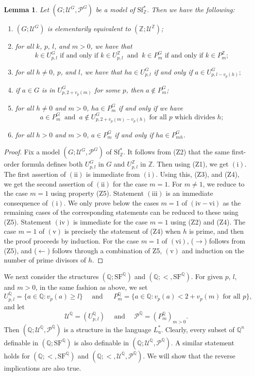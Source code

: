 \documentclass[letterpaper]{amsart}
\newcommand{\qq}{\mathbb{Q}}
\newcommand{\zz}{\mathbb{Z}}
\newcommand{\sU}{\mathscr{U}}
\newcommand{\sP}{\mathscr{P}}
\newcommand{\SQ}{\mathrm{SF}^\qq}
\newcommand{\WSFZ}{\mathrm{Sf}^*_{\zz}}
\newtheorem{lem}[thm]{Lemma}
\begin{document}
\begin{lem} \label{basicpropertiesZ}
Let $(G; \sU^G, \sP^G)$ be a model of $\WSFZ$. Then we have the following:
\begin{enumerate}
\item[$\mathrm{(i)}$] $(G; \sU^G)$ is elementarily equivalent to $(\zz; \sU^\zz)$;
\item[$\mathrm{(ii)}$] for all $k$, $p$, $l$, and $m>0$, we have  that
$$k \in U^G_{p,l} \text{ if and only if } k \in U^\zz_{p,l} \ \text{ and }\  k \in P^G_m \text{ if and only if } k \in P^\zz_m;$$
\item[$\mathrm{(iii)}$] for all $h\neq 0 $, $p$, and $l$, we have that $ha \in U^G_{p,l}$  if and only if $ a \in U^G_{p,l-v_p(h)}; $
\item[$\mathrm{(iv)}$] if $a\in G$ is in $U^G_{p, 2+v_p(m)}$ for some $p$, then $a \notin P^G_m$;
\item[$\mathrm{(v)}$]for all $h\neq 0$ and $m>0$, $ha \in P^G_{m}$ if and only if we have
$$ a \in P^G_{m} \ \text{ and }  \  a \notin U^G_{p,2+ v_p(m) -v_p(h)} \text{ for all } p \text{ which divides } h;$$
\item[$\mathrm{(vi)}$] for all $h>0$ and $m>0$, $a \in P^G_{m}$ if and only if  $ha \in P^G_{mh}$. 
\end{enumerate}
\end{lem}
\begin{proof}
Fix a model $(G; \sU^G, \sP^G)$ of $\WSFZ$.  It follows from (Z2) that the same first-order formula defines both  $U^G_{p,l}$ in $G$ and $U^\zz_{p,l}$ in $\zz$. Then using (Z1), we get $\mathrm{(i)}$. The first assertion of  $\mathrm{(ii)}$ is immediate from $\mathrm{(i)}$. Using this, (Z3), and (Z4), we get the second assertion of  $\mathrm{(ii)}$ for the case $m=1$. For $m \neq 1$,  we reduce to the case $m=1$ using property (Z5). Statement  $\mathrm{(iii)}$ is an immediate consequence of $\mathrm{(i)}$. We only prove below the cases $m = 1$ of $\mathrm{(iv-vi)} $ as the remaining cases of the corresponding statements can be reduced to these using (Z5). Statement $\mathrm{(iv)}$ is immediate for the case $m=1$ using (Z2) and (Z4). The case $m=1$ of $\mathrm{(v)}$ is precisely the statement of (Z4) when $h$ is prime, and then the proof proceeds by induction. For the case $m=1$ of $\mathrm{(vi)}$, ($\rightarrow$) follows from (Z5), and ($\leftarrow$) follows through a combination of Z5, $\mathrm{(v)}$ and induction on the number of prime divisors of $h$. 
\end{proof}

\noindent We next consider the structures $(\qq; \SQ)$ and  $(\qq; <,  \SQ)$. For given $p$, $l$, and $m>0$, in the same fashion as above,  we set 
$$U^\qq_{p, l} = \{ a \in \qq : v_p(a) \geq l\}\quad  \text{ and } \quad \ P^\qq_m = \{ a \in \qq : v_p(a) < 2 + v_p(m) \text{ for  all } p\},$$
 and let
$$\sU^\qq = ( U^\qq_{p, l})\quad  \text{ and } \quad  \sP^\qq = (P^\qq_m)_{m>0}.$$ 
Then $(\qq; \sU^\qq, \sP^\qq)$ is a structure in the language $L_\mathrm{u}^*$. Clearly, every subset of $\qq^n$ definable in $(\qq; \SQ)$ is also definable in $(\qq; \sU^\qq, \sP^\qq)$. A similar statement holds for  $(\qq; <, \SQ)$ and  $(\qq; <, \sU^\qq, \sP^\qq)$.  We will show that the reverse implications are also true.
\end{document}
